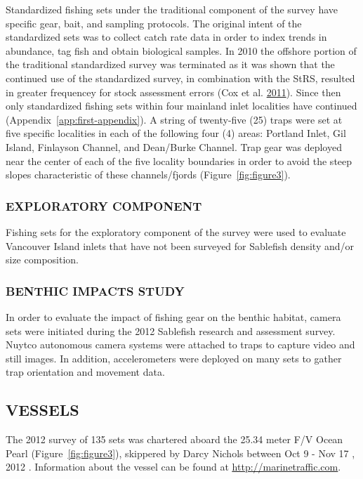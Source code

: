 \documentclass[12pt]{article}\usepackage[]{graphicx}\usepackage[]{color}
\begin{document}
Standardized fishing sets under the traditional component of the survey have specific gear, bait, and sampling protocols. The original intent of the standardized sets was to collect catch rate data in order to index trends in abundance, tag fish and obtain biological samples. In 2010 the offshore portion of the traditional standardized survey was terminated as it was shown that the continued use of the standardized survey, in combination with the StRS, resulted in greater frequencey for stock assessment errors (Cox et al. \protect\hyperlink{ref-Cox2011}{2011}). Since then only standardized fishing sets within four mainland inlet localities have continued (Appendix~\ref{app:first-appendix}). A string of twenty-five (25) traps were set at five specific localities in each of the following four (4) areas: Portland Inlet, Gil Island, Finlayson Channel, and Dean/Burke Channel. Trap gear was deployed near the center of each of the five locality boundaries in order to avoid the steep slopes characteristic of these channels/fjords (Figure~\ref{fig:figure3}).

\hypertarget{exploratory-component}{%
\subsubsection{EXPLORATORY COMPONENT}\label{exploratory-component}}

Fishing sets for the exploratory component of the survey were used to evaluate Vancouver Island inlets that have not been surveyed for Sablefish density and/or size composition.

\hypertarget{benthic-impacts-study}{%
\subsubsection{BENTHIC IMPACTS STUDY}\label{benthic-impacts-study}}

In order to evaluate the impact of fishing gear on the benthic habitat, camera sets were initiated during the 2012 Sablefish research and assessment survey. Nuytco autonomous camera systems were attached to traps to capture video and still images. In addition, accelerometers were deployed on many sets to gather trap orientation and movement data.

\hypertarget{vessels}{%
\subsection{VESSELS}\label{vessels}}

The 2012 survey of 135 sets was chartered aboard the 25.34 meter F/V Ocean Pearl (Figure~\ref{fig:figure3}), skippered by Darcy Nichols between Oct 9 - Nov 17 , 2012 . Information about the vessel can be found at \href{http://marinetraffic.com}{\underline{http://marinetraffic.com}}.
\end{document}
